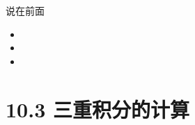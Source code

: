 
\titlepage

\begin{frame}{说在前面}
	\linespread{1.5}
	  \begin{itemize}[<+-|alert@+>]
	    \item {}
	    \item {}
	    \item {}
	  \end{itemize}
\end{frame}


\section{10.3 三重积分的计算}

